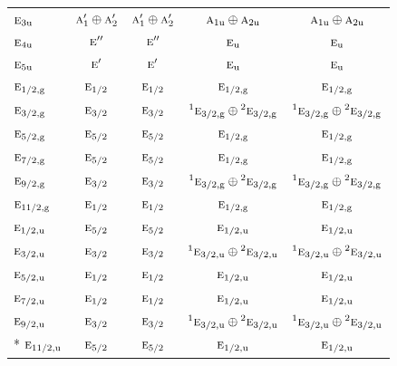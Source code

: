 \documentclass[10pt,a4paper]{article}
\numberwithin{equation}{section}
\newcommand{\irr}[1]{\text{\normalfont\scshape #1}}
\newcommand{\conjpair}[1]{{}^{#1}}
\newcommand{\ptag}[1]{\mathrm{#1}}
\begin{document}
{\begin{longtable}{@{}lcccc@{}}
$\irr{e}_{3\ptag{u}}$ & $\irr{a}_{1}'\oplus \irr{a}_{2}'$ & $\irr{a}_{1}'\oplus \irr{a}_{2}'$ & $\irr{a}_{1\ptag{u}}\oplus \irr{a}_{2\ptag{u}}$ & $\irr{a}_{1\ptag{u}}\oplus \irr{a}_{2\ptag{u}}$\\
$\irr{e}_{4\ptag{u}}$ & $\irr{e}''$ & $\irr{e}''$ & $\irr{e}_{\ptag{u}}$ & $\irr{e}_{\ptag{u}}$\\
$\irr{e}_{5\ptag{u}}$ & $\irr{e}'$ & $\irr{e}'$ & $\irr{e}_{\ptag{u}}$ & $\irr{e}_{\ptag{u}}$\\
$\irr{e}_{1/2,\ptag{g}}$ & $\irr{e}_{1/2}$ & $\irr{e}_{1/2}$ & $\irr{e}_{1/2,\ptag{g}}$ & $\irr{e}_{1/2,\ptag{g}}$\\
$\irr{e}_{3/2,\ptag{g}}$ & $\irr{e}_{3/2}$ & $\irr{e}_{3/2}$ & $\conjpair{1}\irr{e}_{3/2,\ptag{g}}\oplus \conjpair{2}\irr{e}_{3/2,\ptag{g}}$ & $\conjpair{1}\irr{e}_{3/2,\ptag{g}}\oplus \conjpair{2}\irr{e}_{3/2,\ptag{g}}$\\
$\irr{e}_{5/2,\ptag{g}}$ & $\irr{e}_{5/2}$ & $\irr{e}_{5/2}$ & $\irr{e}_{1/2,\ptag{g}}$ & $\irr{e}_{1/2,\ptag{g}}$\\
$\irr{e}_{7/2,\ptag{g}}$ & $\irr{e}_{5/2}$ & $\irr{e}_{5/2}$ & $\irr{e}_{1/2,\ptag{g}}$ & $\irr{e}_{1/2,\ptag{g}}$\\
$\irr{e}_{9/2,\ptag{g}}$ & $\irr{e}_{3/2}$ & $\irr{e}_{3/2}$ & $\conjpair{1}\irr{e}_{3/2,\ptag{g}}\oplus \conjpair{2}\irr{e}_{3/2,\ptag{g}}$ & $\conjpair{1}\irr{e}_{3/2,\ptag{g}}\oplus \conjpair{2}\irr{e}_{3/2,\ptag{g}}$\\
$\irr{e}_{11/2,\ptag{g}}$ & $\irr{e}_{1/2}$ & $\irr{e}_{1/2}$ & $\irr{e}_{1/2,\ptag{g}}$ & $\irr{e}_{1/2,\ptag{g}}$\\
$\irr{e}_{1/2,\ptag{u}}$ & $\irr{e}_{5/2}$ & $\irr{e}_{5/2}$ & $\irr{e}_{1/2,\ptag{u}}$ & $\irr{e}_{1/2,\ptag{u}}$\\
$\irr{e}_{3/2,\ptag{u}}$ & $\irr{e}_{3/2}$ & $\irr{e}_{3/2}$ & $\conjpair{1}\irr{e}_{3/2,\ptag{u}}\oplus \conjpair{2}\irr{e}_{3/2,\ptag{u}}$ & $\conjpair{1}\irr{e}_{3/2,\ptag{u}}\oplus \conjpair{2}\irr{e}_{3/2,\ptag{u}}$\\
$\irr{e}_{5/2,\ptag{u}}$ & $\irr{e}_{1/2}$ & $\irr{e}_{1/2}$ & $\irr{e}_{1/2,\ptag{u}}$ & $\irr{e}_{1/2,\ptag{u}}$\\
$\irr{e}_{7/2,\ptag{u}}$ & $\irr{e}_{1/2}$ & $\irr{e}_{1/2}$ & $\irr{e}_{1/2,\ptag{u}}$ & $\irr{e}_{1/2,\ptag{u}}$\\
$\irr{e}_{9/2,\ptag{u}}$ & $\irr{e}_{3/2}$ & $\irr{e}_{3/2}$ & $\conjpair{1}\irr{e}_{3/2,\ptag{u}}\oplus \conjpair{2}\irr{e}_{3/2,\ptag{u}}$ & $\conjpair{1}\irr{e}_{3/2,\ptag{u}}\oplus \conjpair{2}\irr{e}_{3/2,\ptag{u}}$\\*
$\irr{e}_{11/2,\ptag{u}}$ & $\irr{e}_{5/2}$ & $\irr{e}_{5/2}$ & $\irr{e}_{1/2,\ptag{u}}$ & $\irr{e}_{1/2,\ptag{u}}$\\
\bottomrule\end{longtable}}
\end{document}
